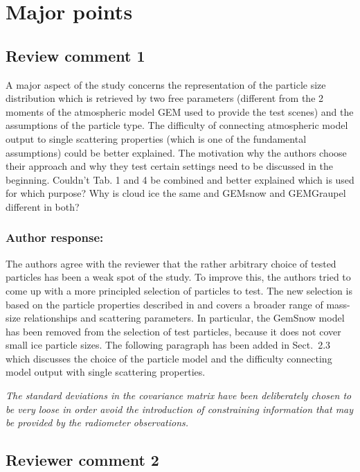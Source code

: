 \documentclass[11pt]{scrartcl}
\author{simon}
\date{\today}
\title{}
\begin{document}
\setlength{\parindent}{0cm}

\section{Major points}

\subsection*{Review comment 1}

A major aspect of the study concerns the representation of the particle size
distribution which is retrieved by two free parameters (different from the 2
moments of the atmospheric model GEM used to provide the test scenes) and the
assumptions of the particle type. The difficulty of connecting atmospheric model
output to single scattering properties (which is one of the fundamental
assumptions) could be better explained. The motivation why the authors choose
their approach and why they test certain settings need to be discussed in the
beginning. Couldn’t Tab. 1 and 4 be combined and better explained which is used
for which purpose? Why is cloud ice the same and GEMsnow and GEMGraupel different
in both?

\subsubsection*{Author response:}

The authors agree with the reviewer that the rather arbitrary choice of
tested particles has been a weak spot of the study. To improve this,
the authors tried to come up with a more principled selection of particles
to test. The new selection is based on the particle properties described
in \citet{ekelund19} and covers a broader range of mass-size relationships
and scattering parameters. In particular, the GemSnow model has been removed
from the selection of test particles, because it does not cover small
ice particle sizes. The following paragraph has been added in Sect.~2.3 which discusses
the choice of the particle model and the difficulty connecting model output
with single scattering properties.
\vspace{1em}

\textit{The standard deviations in the covariance matrix have been deliberately
  chosen to be very loose in order avoid the introduction of constraining
  information that may be provided by the radiometer observations.}

\subsection*{Reviewer comment 2}
\end{document}
